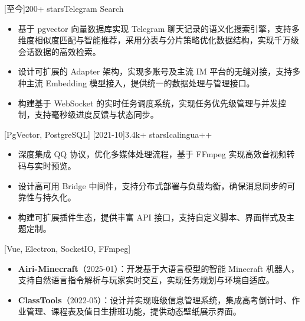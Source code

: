 \documentclass[zh]{resume}
\begin{document}
\begin{projects}
  [至今]{200+ stars}{}{Telegram Search}{
    \begin{itemize}
      \item 基于 pgvector 向量数据库实现 Telegram 聊天记录的语义化搜索引擎，支持多维度相似度匹配与智能推荐，采用分表与分片策略优化数据结构，实现千万级会话数据的高效检索。
      \item 设计可扩展的 Adapter 架构，实现多账号及主流 IM 平台的无缝对接，支持多种主流 Embedding 模型接入，提供统一的数据处理与管理接口。
      \item 构建基于 WebSocket 的实时任务调度系统，实现任务优先级管理与并发控制，支持毫秒级进度反馈与状态同步。
    \end{itemize}
  }[PgVector, PostgreSQL]
  \separator{0.5ex}
  [2021-10]{3.4k+ stars}{}{Icalingua++}{
    \begin{itemize}
      \item 深度集成 QQ 协议，优化多媒体处理流程，基于 FFmpeg 实现高效音视频转码与实时预览。
      \item 设计高可用 Bridge 中间件，支持分布式部署与负载均衡，确保消息同步的可靠性与持久化。
      \item 构建可扩展插件生态，提供丰富 API 接口，支持自定义脚本、界面样式及主题定制。
    \end{itemize}
  }[Vue, Electron, SocketIO, FFmpeg]
\end{projects}

\begin{itemize}
  \item \textbf{Airi-Minecraft}（2025-01）：开发基于大语言模型的智能 Minecraft 机器人，支持自然语言指令解析与玩家实时交互，实现任务规划与环境自适应。
  \item \textbf{ClassTools}（2022-05）：设计并实现班级信息管理系统，集成高考倒计时、作业管理、课程表及值日生排班功能，提供动态壁纸展示界面。
\end{itemize}
\end{document}
